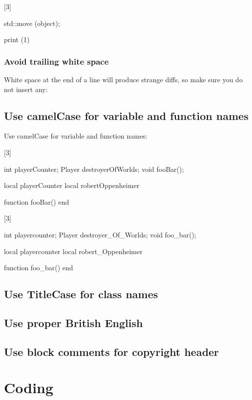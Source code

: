 \documentclass[a4paper,11pt]{scrreprt}
\newcommand{\marginMarker}[1]{%
\marginnote{%
    \hfill%
		\Huge{#1}%
}[3\baselineskip]%
}
\newcommand{\conforming}{%
\marginMarker{\textcolor{green}{\ding{51}}}%
}
\newcommand{\nonconforming}{%
\marginMarker{\textcolor{red}{\ding{55}}}%
}
\begin{document}
\nonconforming{}
\begin{cppBox}[showspaces]
std::move (object);
\end{cppBox}
\begin{luaBox}[showspaces]
print (1)
\end{luaBox}

\subsection{Avoid trailing white space}
White space at the end of a line will produce strange diffs, so make sure you do not insert any:

\section{Use camelCase for variable and function names}
Use camelCase for variable and function names:

\conforming{}
\begin{cppBox}
int playerCounter;
Player destroyerOfWorlds;
void fooBar();
\end{cppBox}
\begin{luaBox}
local playerCounter
local robertOppenheimer

function fooBar()
end
\end{luaBox}

\nonconforming{}
\begin{cppBox}
int playercounter;
Player destroyer_Of_Worlds;
void foo_bar();
\end{cppBox}
\begin{luaBox}
local playercounter
local robert_Oppenheimer

function foo_bar()
end
\end{luaBox}


\section{Use TitleCase for class names}
\section{Use proper British English}
\section{Use block comments for copyright header}


\chapter{Coding}
\end{document}
